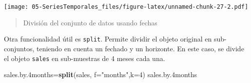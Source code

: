 \documentclass[]{book}
\newenvironment{Shaded}{\begin{snugshade}}{\end{snugshade}}
\newcommand{\DataTypeTok}[1]{\textcolor[rgb]{0.13,0.29,0.53}{#1}}
\newcommand{\DecValTok}[1]{\textcolor[rgb]{0.00,0.00,0.81}{#1}}
\newcommand{\FloatTok}[1]{\textcolor[rgb]{0.00,0.00,0.81}{#1}}
\newcommand{\KeywordTok}[1]{\textcolor[rgb]{0.13,0.29,0.53}{\textbf{#1}}}
\newcommand{\NormalTok}[1]{#1}
\newcommand{\StringTok}[1]{\textcolor[rgb]{0.31,0.60,0.02}{#1}}
\begin{document}
\texttt{[image: 05-SeriesTemporales\_files/figure-latex/unnamed-chunk-27-2.pdf]}

\begin{quote}
División del conjunto de datos usando fechas
\end{quote}

Otra funcionalidad útil es \texttt{split}. Permite dividir el objeto original en sub-conjuntos, teniendo en cuenta un fechado y un horizonte. En este caso, se divide el objeto \texttt{sales} en sub-muestras de 4 meses cada una.

\begin{Shaded}
\begin{Highlighting}[]
\NormalTok{sales.by}\FloatTok{.4}\NormalTok{months=}\KeywordTok{split}\NormalTok{(sales, }\DataTypeTok{f=}\StringTok{"months"}\NormalTok{,}\DataTypeTok{k=}\DecValTok{4}\NormalTok{) }
\NormalTok{sales.by}\FloatTok{.4}\NormalTok{months}
\end{Highlighting}
\end{Shaded}
\end{document}
